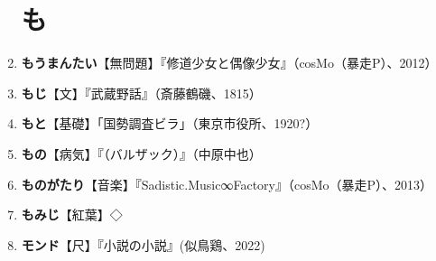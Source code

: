 \documentclass[twocolumn]{jsbook}
\begin{document}
\begin{enumerate}
\section*{も}
    \item \textbf{もうまんたい}【無問題】『修道少女と偶像少女』（cosMo（暴走P）、2012）
    \item \textbf{もじ}【文】『武蔵野話』（斎藤鶴磯、1815）
    \item \textbf{もと}【基礎】「国勢調査ビラ」（東京市役所、1920?）
    \item \textbf{もの}【病気】『（バルザック）』（中原中也）
    \item \textbf{ものがたり}【音楽】『Sadistic.Music∞Factory』（cosMo（暴走P）、2013）
    \item \textbf{もみじ}【紅葉】◇
    \item \textbf{モンド}【尺】『小説の小説』(似鳥鶏、2022)

\end{enumerate}
\end{document}

